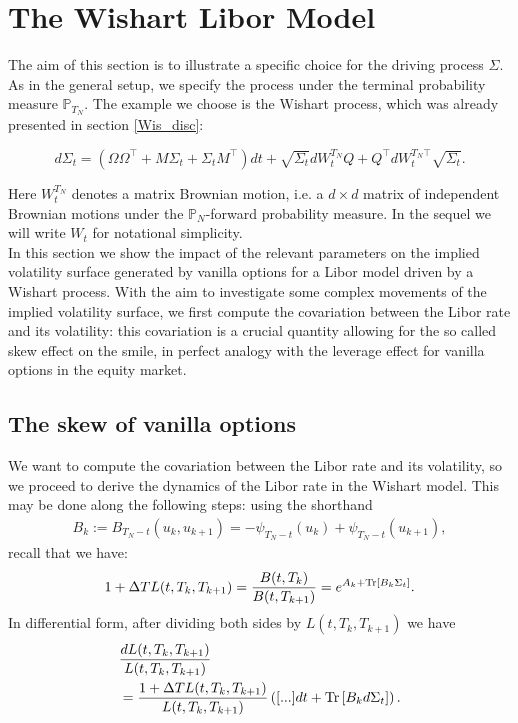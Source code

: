 \section{The Wishart Libor Model}
The aim of this section is to illustrate a specific choice for the driving process $\Sigma$. As in the general setup, we specify the process under the terminal probability measure $\mathbb{P}_{T_N}$. The example we choose is the Wishart process, which was already presented in section \ref{Wis_disc}:

\begin{equation}
d\Sigma_t=(\Omega\Omega^{\top}+M\Sigma_t+\Sigma_tM^{\top})dt+\sqrt{\Sigma_t}dW_t^{T_N}Q+Q^{\top}dW_t^{{T_N}\top}\sqrt{\Sigma_t}.\label{wishart_ni}
\end{equation}

Here $W_t^{T_N}$ denotes a matrix Brownian motion, i.e. a $d\times d$ matrix of independent Brownian motions under the $\mathbb{P}_{N}$-forward probability measure. In the sequel we will write $W_t$ for notational simplicity.\\ 

In this section we show the impact of the relevant parameters on the implied volatility surface generated by vanilla options for a Libor model driven by a Wishart process. With the aim to investigate some complex movements of the implied volatility surface, we first compute the covariation between the Libor rate and its volatility: this covariation is a crucial quantity allowing for the so called skew effect on the smile, in perfect analogy with the leverage effect for vanilla options in the equity market.
 
\subsection{The skew of vanilla options}
We want to compute the covariation between the Libor rate and its volatility, so we proceed to derive the dynamics of the Libor rate in the Wishart  model. This may be done along the following steps: using the shorthand
\begin{align}
B_k:=B_{T_N-t}(u_k,u_{k+1})=-\psi_{T_N-t}(u_k)+\psi_{T_N-t}(u_{k+1}),
\end{align}
recall that we have:
\begin{align}
1+\Delta T L(t,T_k,T_{k+1})=\frac{B(t,T_k)}{B(t,T_{k+1})}=e^{A_k+\textup{Tr}\left[B_k \Sigma_t\right]}.
\end{align}
In differential form, after dividing both sides by $L(t,T_k,T_{k+1})$ we have
\begin{align}
&\frac{dL(t,T_k,T_{k+1})}{L(t,T_k,T_{k+1})}\nonumber\\
&=\frac{1+\Delta T L(t,T_k,T_{k+1})}{L(t,T_k,T_{k+1})}\left([...]dt+\textup{Tr}\left[B_k d\Sigma_t\right]\right).
\label{dynLibor}\end{align}


